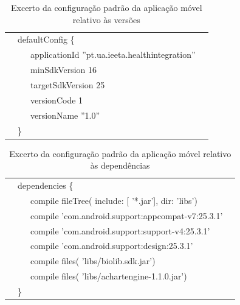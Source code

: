 \begin{table}[H]
\centering
\begin{tabular}{|llll|}
\hline
 & \multicolumn{2}{l}{defaultConfig \{}                                     &  \\
 &    & applicationId {\color[HTML]{009901} ''pt.ua.ieeta.healthintegration''}                       &  \\
 &    & minSdkVersion {\color[HTML]{0767D2}16}                                                    &  \\
 &    & targetSdkVersion {\color[HTML]{0767D2}25}                                                 &  \\
 &    & versionCode {\color[HTML]{0767D2}1}                                                       &  \\
 &    & versionName {\color[HTML]{009901}''1.0''}                                                   &  \\
 & \} &                                                                     & \\
\hline
\end{tabular}
\caption[Excerto da configuração padrão da aplicação móvel relativo às versões]{Excerto da configuração padrão da aplicação móvel relativo às versões}
\label{t:defaultconfigversions}
\end{table}

\begin{table}[H]
\centering
\begin{tabular}{|llll|}
\hline
 & \multicolumn{2}{l}{dependencies \{}                                     &  \\
 &    &  compile fileTree({\color[HTML]{009901} include}: [{\color[HTML]{009901} '*.jar'}], {\color[HTML]{009901} dir}: {\color[HTML]{009901} 'libs'})   &  \\
 &    & compile {\color[HTML]{009901} 'com.android.support:appcompat-v7:25.3.1'} &  \\
 &    & compile {\color[HTML]{009901} 'com.android.support:support-v4:25.3.1'} &  \\
 &    & compile {\color[HTML]{009901} 'com.android.support:design:25.3.1'} &  \\
 &    & compile files( {\color[HTML]{009901} 'libs/biolib.sdk.jar'})&  \\
 &    & compile files( {\color[HTML]{009901} 'libs/achartengine-1.1.0.jar'})&  \\
 & \} &                                                                     & \\
\hline
\end{tabular}
\caption[Excerto da configuração padrão da aplicação móvel relativo às dependências]{Excerto da configuração padrão da aplicação móvel relativo às dependências}
\label{t:defaultconfigdependency}
\end{table}

